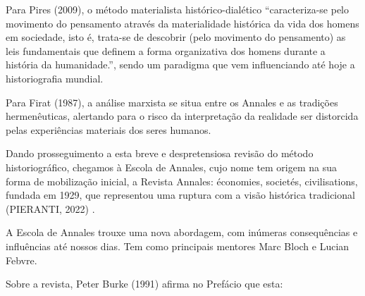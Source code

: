 \documentclass[
12pt,		%
openright,	%
twoside,  %
a4paper,			%
chapter=TITLE,		%
english,			%
french,				%
spanish,			%
brazil				%
]{USPSC-classe/USPSC}
\begin{document}
Para  Pires (2009), o m\'etodo materialista hist\'orico-dial\'etico “caracteriza-se pelo movimento do pensamento atrav\'es da materialidade hist\'orica da vida dos homens em sociedade, isto \'e, trata-se de descobrir (pelo movimento do pensamento) as leis fundamentais que definem a forma organizativa dos homens durante a hist\'oria da humanidade.”, sendo um paradigma que vem influenciando at\'e hoje a historiografia mundial.




Para Firat (1987), \textquotedbl a an\'alise marxista se situa entre os Annales e as tradi\c{c}\~oes hermen\^euticas\textquotedbl , alertando para o risco da interpreta\c{c}\~ao da realidade ser distorcida pelas \textquotedbl experi\^encias materiais dos seres humanos\textquotedbl .




Dando prosseguimento a esta breve e despretensiosa revis\~ao do m\'etodo historiogr\'afico, chegamos \`a Escola de Annales, cujo nome tem origem na sua forma de mobiliza\c{c}\~ao inicial, a Revista Annales: \'economies, societ\'es, civilisations, fundada em 1929, que representou uma ruptura com a vis\~ao hist\'orica tradicional (PIERANTI, 2022) .




A Escola de Annales trouxe uma nova abordagem, com in\'umeras consequ\^encias e influ\^encias at\'e nossos dias. Tem como principais mentores  Marc Bloch e Lucian Febvre.




Sobre a revista, Peter Burke (1991) afirma no Pref\'acio que esta:





\noindent\begin{center}\mbox{\centering{}}\end{center}
\end{document}
